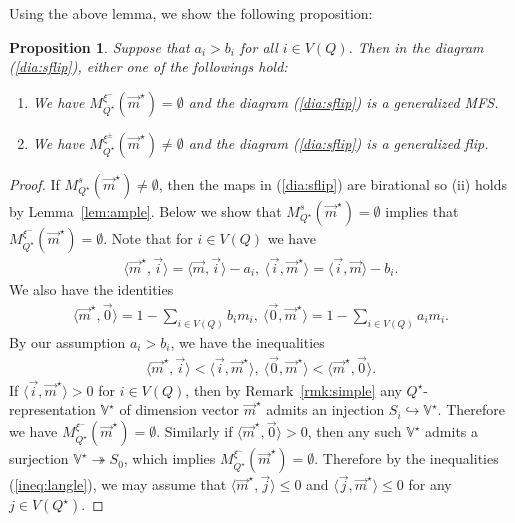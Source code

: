 \documentclass[11pt]{amsart}
\theoremstyle{plain}
\newtheorem{prop}[thm]{Proposition}
\theoremstyle{definition}
\theoremstyle{remark}
\begin{document}
Using the above lemma, we show the following proposition: 
\begin{prop}\label{prop:Mflip}
Suppose that $a_i>b_i$ for all $i \in V(Q)$.
 Then 
in the diagram (\ref{dia:sflip}), 
either one of the followings hold: 
\begin{enumerate}
\item We have $M_{Q^{\star}}^{\xi^{-}}(\vec{m}^{\star})=\emptyset$
and the diagram (\ref{dia:sflip}) is a generalized MFS. 
\item We have 
$M_{Q^{\star}}^{\xi^{\pm}}(\vec{m}^{\star})\neq \emptyset$
and the diagram (\ref{dia:sflip}) is a generalized flip. 
\end{enumerate}
\end{prop}
\begin{proof}
If $M_{Q^{\star}}^{s}(\vec{m}^{\star}) \neq \emptyset$, 
then 
the maps in (\ref{dia:sflip}) are birational 
so 
(ii) holds by Lemma~\ref{lem:ample}. 
Below we show that
$M_{Q^{\star}}^{s}(\vec{m}^{\star}) = \emptyset$
implies that 
$M_{Q^{\star}}^{\xi^{-}}(\vec{m}^{\star}) = \emptyset$. 
Note that for $i\in V(Q)$ we have
\begin{align*}
\langle \vec{m}^{\star}, \vec{i} \rangle 
=\langle \vec{m}, \vec{i} \rangle -a_i, \ 
\langle \vec{i}, \vec{m}^{\star}\rangle 
=\langle \vec{i}, \vec{m} \rangle -b_i.
\end{align*}
We also have the identities
\begin{align*}
\langle \vec{m}^{\star}, \vec{0} \rangle 
=1-\sum_{i\in V(Q)} b_i m_i, \ 
\langle \vec{0}, \vec{m}^{\star} \rangle 
=1-\sum_{i\in V(Q)} a_i m_i.
\end{align*}
By our assumption $a_i>b_i$, we have the inequalities
\begin{align}\label{ineq:langle}
\langle \vec{m}^{\star}, \vec{i} \rangle 
<\langle \vec{i}, \vec{m}^{\star} \rangle, \ 
\langle \vec{0}, \vec{m}^{\star}\rangle
<
\langle \vec{m}^{\star}, \vec{0} \rangle.
\end{align}
If $\langle \vec{i}, \vec{m}^{\star} \rangle>0$
for $i\in V(Q)$,  
then by Remark~\ref{rmk:simple}
any $Q^{\star}$-representation $\mathbb{V}^{\star}$ of dimension vector 
$\vec{m}^{\star}$ admits an injection $S_i \hookrightarrow 
\mathbb{V}^{\star}$. 
Therefore we have $M_{Q^{\star}}^{\xi^{-}}(\vec{m}^{\star}) = \emptyset$. 
Similarly if 
$\langle \vec{m}^{\star}, \vec{0} \rangle>0$, then 
any such $\mathbb{V}^{\star}$ admits a surjection 
$\mathbb{V}^{\star}\twoheadrightarrow S_0$, which implies 
$M_{Q^{\star}}^{\xi^{-}}(\vec{m}^{\star}) = \emptyset$. 
Therefore by the inequalities (\ref{ineq:langle}), 
we may assume that 
$\langle \vec{m}^{\star}, \vec{j}\rangle \le 0$
and $\langle \vec{j}, \vec{m}^{\star} \rangle \le 0$
for any $j \in V(Q^{\star})$. 


\end{proof}
\end{document}
